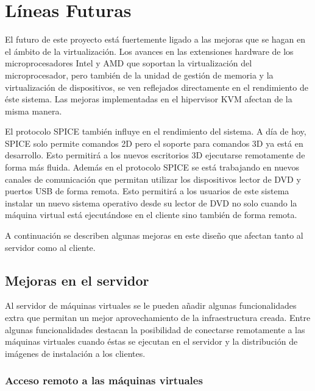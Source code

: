 \documentclass[spanisheDIVcalc,twoside,parskip-,pointlessnumbers,final]{scrbook}
\newcommand{\clearemptydoublepage}{\newpage{\pagestyle{empty}\cleardoublepage}}
\begin{document}
\clearemptydoublepage
\chapter{Líneas Futuras}

El futuro de este proyecto está fuertemente ligado a las mejoras que
se hagan en el ámbito de la virtualización. Los avances en las extensiones
hardware de los microprocesadores Intel y AMD que soportan la virtualización
del microprocesador, pero también de la unidad de gestión de memoria
y la virtualización de dispositivos, se ven reflejados directamente
en el rendimiento de éste sistema. Las mejoras implementadas en el
hipervisor KVM afectan de la misma manera.

El protocolo SPICE también influye en el rendimiento del sistema.
A día de hoy, SPICE solo permite comandos 2D pero el soporte para
comandos 3D ya está en desarrollo. Esto permitirá a los nuevos escritorios
3D ejecutarse remotamente de forma más fluida. Además en el protocolo
SPICE se está trabajando en nuevos canales de comunicación que permitan
utilizar los dispositivos lector de DVD y puertos USB de forma remota.
Esto permitirá a los usuarios de este sistema instalar un nuevo sistema
operativo desde su lector de DVD no solo cuando la máquina virtual
está ejecutándose en el cliente sino también de forma remota.

A continuación se describen algunas mejoras en este diseño que afectan
tanto al servidor como al cliente.


\section{Mejoras en el servidor}

Al servidor de máquinas virtuales se le pueden añadir algunas funcionalidades
extra que permitan un mejor aprovechamiento de la infraestructura
creada. Entre algunas funcionalidades destacan la posibilidad de conectarse
remotamente a las máquinas virtuales cuando éstas se ejecutan en el
servidor y la distribución de imágenes de instalación a los clientes.


\subsection{Acceso remoto a las máquinas virtuales}
\end{document}
